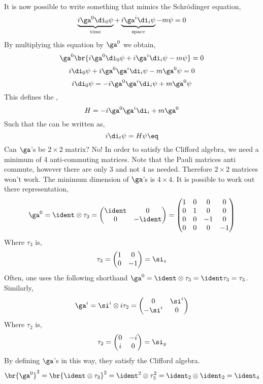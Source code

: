 \documentclass{article}
\begin{document}
It is now possible to write something that mimics the Schrödinger equation,
\[ \underbrace{i \ga^{0} \di_{0} \psi}_{\text{time}} + \underbrace{i \ga^{i} \di_{i} \psi}_{\text{space}} - m \psi = 0\]
By multiplying this equation by $\ga^{0}$ we obtain,
\[ \ga^{0}\br{i \ga^{0} \di_{0} \psi + i \ga^{i} \di_{i} \psi - m \psi} = 0\]
\[ i \di_{0} \psi + i \ga^{0}\ga^{i} \di_{i} \psi - m \ga^{0}\psi = 0\]
\[ i \di_{0} \psi = - i \ga^{0}\ga^{i} \di_{i} \psi + m \ga^{0}\psi\]
This defines the ,
\[ H = - i \ga^{0}\ga^{i} \di_{i} + m \ga^{0} \]
Such that the  can be written as,
\[ i \di_t \psi = H \psi \eq \label{eq:dirac_equation}\]
Can $\ga$'s be $2 \times 2$ matrix? No! In order to satisfy the Clifford algebra, we need a minimum of 4 anti-commuting matrices. Note that the Pauli matrices anti commute, however there are only $3$ and not $4$ as needed. Therefore $2 \times 2$ matrices won't work. The minimum dimension of $\ga$'s is $4 \times 4$. It is possible to work out there representation,
\[\ga^{0} = \ident \otimes \tau_{3} = \begin{pmatrix}
    \ident & 0 \\
    0 & -\ident
\end{pmatrix} = \begin{pmatrix}
    1 & 0 & 0 & 0 \\
    0 & 1 & 0 & 0 \\
    0 & 0 & -1 & 0 \\
    0 & 0 & 0 & -1 \\
\end{pmatrix} \]
Where $\tau_3$ is,
\[ \tau_3 = \begin{pmatrix}
    1 & 0 \\
    0 & -1
\end{pmatrix} = \si_z \]
Often, one uses the following shorthand $\ga^{0} = \ident \otimes \tau_3 = \ident \tau_3 = \tau_3$. Similarly,
\[ \ga^{i} = \si^{i} \otimes i \tau_{2} = \begin{pmatrix}
    0 & \si^{i} \\
    - \si^{i} & 0 \\
\end{pmatrix} \]
Where $\tau_2$ is,
\[ \tau_{2} = \begin{pmatrix}
    0 & -i \\
    i & 0
\end{pmatrix} = \si_{y} \]
By defining $\ga$'s in this way, they satisfy the Clifford algebra.
\[ \br{\ga^{0}}^2 = \br{\ident \otimes \tau_{3}}^2 = \ident^2 \otimes \tau_{3}^2 = \ident_{2} \otimes \ident_{2} = \ident_{4} \]
\end{document}
